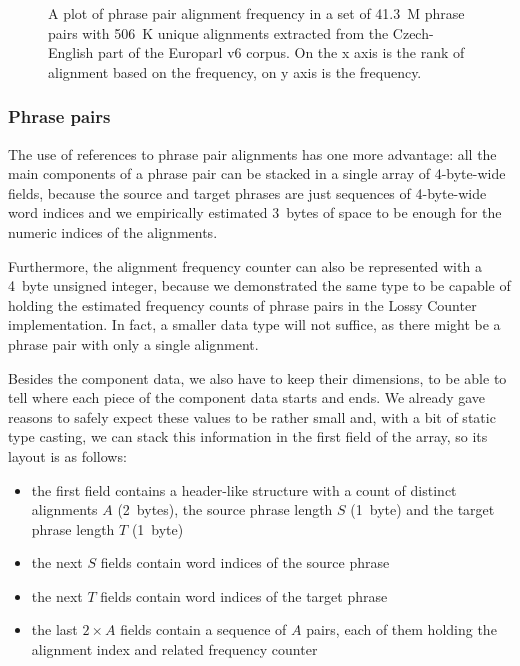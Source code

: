 \begin{figure}[ht]
  
  \caption{
    A plot of phrase pair alignment frequency in a set of 41.3~M phrase pairs with
    506~K unique alignments extracted from the Czech-English part of the Europarl v6 corpus.
    On the x axis is the rank of alignment based on the frequency, on y axis is the frequency.
  }
  \label{fig:alignment-dist}
\end{figure}

\subsubsection*{Phrase pairs}

The use of references to phrase pair alignments has one more advantage: all the main
components of a phrase pair can be stacked in a single array of 4-byte-wide fields,
because the source and target phrases are just sequences of 4-byte-wide word indices
and we empirically estimated 3~bytes of space to be enough for the numeric indices
of the alignments.

Furthermore, the alignment frequency counter can also be represented with a 4~byte
unsigned integer, because we demonstrated the same type to be capable of holding
the estimated frequency counts of phrase pairs in the Lossy Counter implementation.
In fact, a smaller data type will not suffice, as there might be a phrase pair with
only a single alignment.

Besides the component data, we also have to keep their dimensions,
to be able to tell where each piece of the component data starts and ends.
We already gave reasons to safely expect these values to be rather small and,
with a bit of static type casting, we can stack this information in the first
field of the array, so its layout is as follows:
\begin{itemize}
  \item the first field contains a header-like structure with a count
    of distinct alignments $A$ (2~bytes),
    the source phrase length $S$ (1~byte) and the target phrase length $T$ (1~byte)
  \item the next $S$ fields contain word indices of the source phrase
  \item the next $T$ fields contain word indices of the target phrase
  \item the last $2 \times A$ fields contain a sequence of $A$ pairs, each of them
    holding the alignment index and related frequency counter
\end{itemize}

